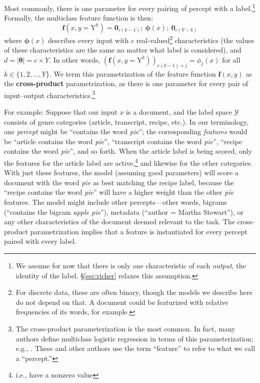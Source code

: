 \documentclass[11pt,letterpaper]{article}
\newcommand{\ensuretext}[1]{#1}
\newcommand{\nssmarker}{\ensuretext{\textcolor{magenta}{\ensuremath{^{\textsc{NS}}_{\textsc{S}}}}}}
\newcommand{\arkcomment}[3]{\ensuretext{\textcolor{#3}{[#1 #2]}}}
\newcommand{\nss}[1]{\arkcomment{\nssmarker}{#1}{magenta}}
\newcommand{\Sref}[1]{\S\ref{#1}}
\begin{document}
Most commonly, there is one parameter for every pairing of percept with a label.\footnote{We assume 
for now that there is only one characteristic of each {\em output}, the identity of the label. \Sref{sec:richer} relaxes this assumption.}
Formally, the multiclass feature function is then:
\begin{equation}\label{eq:crossprod}
\mathbf{f}(x,y=\mathrm{Y}^k) = \mathbf{0}_{c(k-1)};\  \boldsymbol{\phi}(x);\  \mathbf{0}_{c(Y-k)}
\end{equation}
where $\boldsymbol{\phi}(x)$ describes every input with $c$ real-valued\footnote{For discrete data, these are often binary, though the models we describe here do not depend on that. A document could be featurized with relative frequencies of its words, for example.} 
characteristics (the values of these characteristics are the same no matter what label is considered), 
and $d = |\boldsymbol{\theta}| = c \times Y$.
In other words, $\left(\mathbf{f}(x,y=\mathrm{Y}^k)\right)_{c(k-1)+j} = \phi_j(x)$ for all $k\in\{1,2,\ldots,Y\}$.
We term this parametrization of the feature function $\mathbf{f}(x,y)$ as the {\bf cross-product}
parametrization, as there is one parameter for every pair of input--output characteristics.\footnote{The cross-product parameterization is the most common. 
In fact, many authors define multiclass logistic regression in terms of this parameterization; e.g., \citet{hastie-09}. 
These and other authors use the term ``feature'' to refer to what we call a ``percept.''}

For example: Suppose that our input $x$ is a document, and the label space $\mathcal{Y}$ consists of genre categories ({\sc article}, {\sc transcript}, {\sc recipe}, etc.).
In our terminology, one {\em percept} might be ``contains the word \textit{pie}''; the corresponding {\em features} 
would be ``{\sc article} contains the word \textit{pie}'', ``{\sc transcript} contains the word \textit{pie}'', ``{\sc recipe} contains the word \textit{pie}'', 
and so forth. When the {\sc article} label is being scored, only the features for the {\sc article} label are active,\footnote{i.e., have a nonzero value} 
and likewise for the other categories. With just these features, the model (assuming good parameters) will score 
a document with the word \textit{pie} as best matching the {\sc recipe} label, because the 
``{\sc recipe} contains the word \textit{pie}'' will have a higher weight than the other \textit{pie} features.
The model might include other percepts---other words, bigrams (``contains the bigram \textit{apple pie}''), 
metadata (``author = Martha Stewart''), or any other characteristics of the document deemed relevant to the task.
The cross-product parametrization implies that a feature is instantiated for every percept paired with every label.
\end{document}
